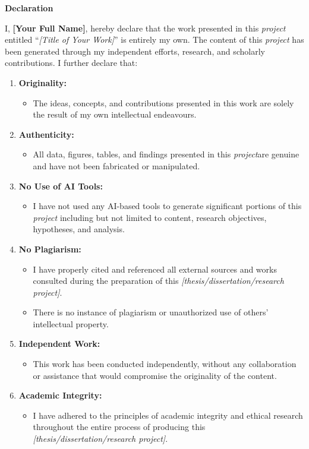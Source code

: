 \begin{center}
	\textbf{\Large Declaration}
\end{center}

I, \textbf{[Your Full Name]}, hereby declare that the work presented in this \textit{project} entitled ``\textit{[Title of Your Work]}'' is entirely my own. The content of this \textit{ project} has been generated through my independent efforts, research, and scholarly contributions. I further declare that:
\begin{enumerate}
	\item \textbf{Originality:}
	\begin{itemize}
		\item The ideas, concepts, and contributions presented in this work are solely the result of my own intellectual endeavours.
	\end{itemize}
		\item \textbf{Authenticity:}
	\begin{itemize}
		\item All data, figures, tables, and findings presented in this \textit{project}are genuine and have not been fabricated or manipulated.
	\end{itemize}
		\item \textbf{No Use of AI Tools:}
	\begin{itemize}
		\item I have not used any AI-based tools to generate significant portions of this \textit{ project} including but not limited to content, research objectives, hypotheses, and analysis.
	\end{itemize}
		\item \textbf{No Plagiarism:}
	\begin{itemize}
		\item I have properly cited and referenced all external sources and works consulted during the preparation of this \textit{[thesis/dissertation/research project]}.
		\item There is no instance of plagiarism or unauthorized use of others' intellectual property.
	\end{itemize}
		\item \textbf{Independent Work:}
	\begin{itemize}
		\item This work has been conducted independently, without any collaboration or assistance that would compromise the originality of the content.
	\end{itemize}
		\item \textbf{Academic Integrity:}
	\begin{itemize}
		\item I have adhered to the principles of academic integrity and ethical research throughout the entire process of producing this \textit{[thesis/dissertation/research project]}.
	\end{itemize}
\end{enumerate}
